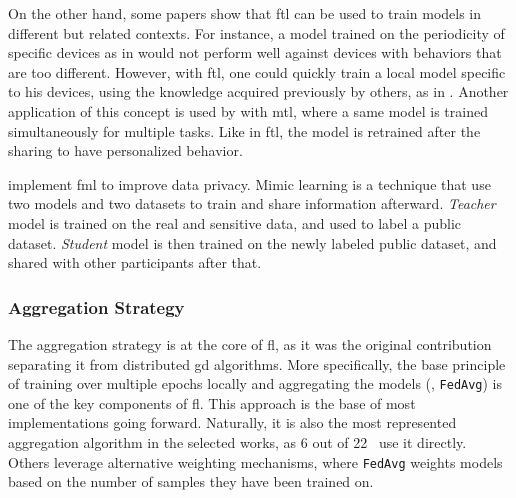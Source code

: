 On the other hand, some papers show that \gls{ftl} can be used to train models in different but related contexts.
For instance, a model trained on the periodicity of specific devices as in \cite{pahl_AllEyesYou_2018,nguyen_DIoTFederatedSelflearning_2019} would not perform well against devices with behaviors that are too different.
However, with \gls{ftl}, one could quickly train a local model specific to his devices, using the knowledge acquired previously by others, as in \cite{fan_IoTDefenderFederatedTransfer_2020}.
Another application of this concept is used by \cite{zhao_MultiTaskNetworkAnomaly_2019} with \gls{mtl}, where a same model is trained simultaneously for multiple tasks.
Like in \gls{ftl}, the model is retrained after the sharing to have personalized behavior.

\textcite{al-athbaal-marri_FederatedMimicLearning_2020} implement \gls{fml} to improve data privacy.
Mimic learning is a technique that use two models and two datasets to train and share information afterward.
\emph{Teacher} model is trained on the real and sensitive data, and used to label a public dataset.
\emph{Student} model is then trained on the newly labeled public dataset, and shared with other participants after that.


\subsubsection{Aggregation Strategy\label{sec:sota.quali.agg}}

The aggregation strategy is at the core of \gls{fl}, as it was the original contribution~\cite{mcmahan_Communicationefficientlearningdeep_2017} separating it from distributed \gls{gd} algorithms.
More specifically, the base principle of training over multiple epochs locally and aggregating the models (\ie, \texttt{FedAvg}) is one of the key components of \gls{fl}.
This approach is the base of most implementations going forward.
Naturally, it is also the most represented aggregation algorithm in the selected works, as 6 out of 22~\cite{nguyen_DIoTFederatedSelflearning_2019,popoola_FederatedDeepLearning_2021a,qin_FederatedLearningBasedNetwork_2021,al-athbaal-marri_FederatedMimicLearning_2020,kim_CollaborativeAnomalyDetection_2020,rahman_InternetThingsIntrusion_2020} use it directly.
Others leverage alternative weighting mechanisms, where \texttt{FedAvg} weights models based on the number of samples they have been trained on.

